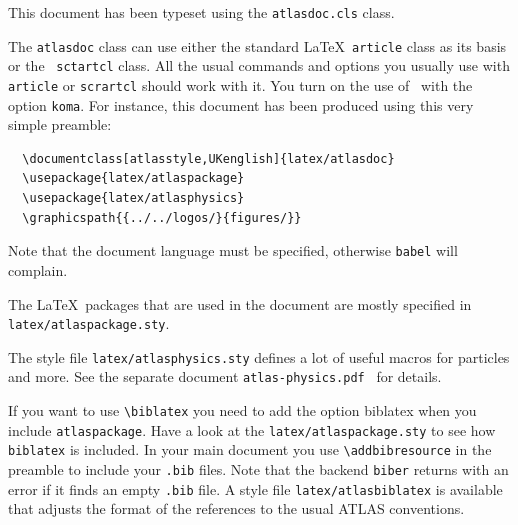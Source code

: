 \documentclass[atlasstyle,UKenglish]{latex/atlasdoc}
\newcommand{\File}[1]{\texttt{#1}\xspace}
\newcommand{\Macro}[1]{\texttt{\textbackslash #1}\xspace}
\newcommand{\Option}[1]{\textsf{#1}\xspace}
\newcommand{\Package}[1]{\texttt{#1}\xspace}
\begin{document}
This document has been typeset using the \texttt{atlasdoc.cls} class.

The \texttt{atlasdoc} class can use either the standard \LaTeX\ \texttt{article} class
as its basis or the \KOMAScript\ \texttt{sctartcl} class.
All the usual commands and options you usually use
with \texttt{article}  or \texttt{scrartcl} should work with it. 
You turn on the use of \KOMAScript\ with the option \texttt{koma}.
For instance, this document has
been produced using this very simple preamble:
%
\begin{verbatim}
  \documentclass[atlasstyle,UKenglish]{latex/atlasdoc}
  \usepackage{latex/atlaspackage}
  \usepackage{latex/atlasphysics}
  \graphicspath{{../../logos/}{figures/}}
\end{verbatim}
%
Note that the document language must be specified, otherwise \texttt{babel} will complain.

The \LaTeX\ packages that are used in the document are mostly specified in 
\texttt{latex/atlaspackage.sty}.

The style file \texttt{latex/atlasphysics.sty} defines a lot of useful
macros for particles and more. See the separate document
\texttt{atlas-physics.pdf}~\cite{atlas-physics} for details.

If you want to use \Macro{biblatex} you need to add the option \Option{biblatex} when you
include \texttt{atlaspackage}.
Have a look at the \texttt{latex/atlaspackage.sty} to see how \texttt{biblatex} is included.
In your main document you use \Macro{addbibresource} in the preamble to include your \texttt{.bib} files.
Note that the backend \Package{biber} returns with an error if it finds an empty \texttt{.bib} file.
A style file \File{latex/atlasbiblatex} is available that adjusts the format of the references to the usual ATLAS conventions.
\end{document}
